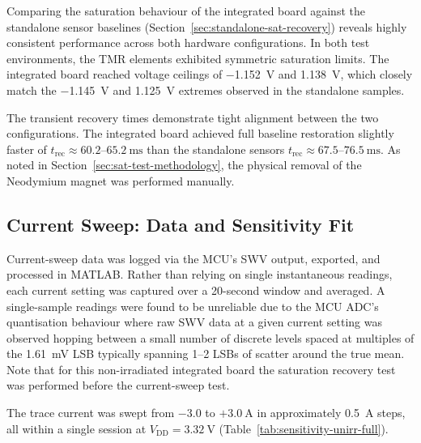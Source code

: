 \documentclass[12pt,a4paper]{article}
\begin{document}
Comparing the saturation behaviour of the integrated board against the standalone sensor baselines (Section~\ref{sec:standalone-sat-recovery}) reveals highly consistent performance across both hardware configurations. In both test environments, the TMR elements exhibited symmetric saturation limits. The integrated board reached voltage ceilings of \SI{-1.152}{\volt} and \SI{+1.138}{\volt}, which closely match the \SI{-1.145}{\volt} and \SI{+1.125}{\volt} extremes observed in the standalone samples. 

The transient recovery times demonstrate tight alignment between the two configurations. The integrated board achieved full baseline restoration slightly faster of $t_{\text{rec}} \approx 60.2\text{--}\SI{65.2}{\milli\second}$ than the standalone sensors $t_{\text{rec}} \approx 67.5\text{--}\SI{76.5}{\milli\second}$.  As noted in Section~\ref{sec:sat-test-methodology}, the physical removal of the Neodymium magnet was performed manually. 

\subsection{Current Sweep: Data and Sensitivity Fit}
\label{sec:sensitivity-fit}

Current-sweep data was logged via the MCU's SWV output, exported, and processed in MATLAB. Rather than relying on single instantaneous readings, each current setting was captured over a 20-second window and averaged. A single-sample readings were found to be unreliable due to the  MCU ADC's quantisation behaviour where raw SWV data at a given current setting was observed hopping between a small number of discrete levels spaced at multiples of the \SI{1.61}{\milli\volt} LSB typically spanning 1--2 LSBs of scatter around the true mean. Note that for this non-irradiated integrated board the saturation recovery test was performed before the current-sweep test.



The trace current was swept from $-3.0$ to $+\SI{3.0}{\ampere}$ in approximately \SI{0.5}{\ampere} steps, all within a single session at $V_{\text{DD}} = \SI{3.32}{\volt}$ (Table~\ref{tab:sensitivity-unirr-full}).
\end{document}
